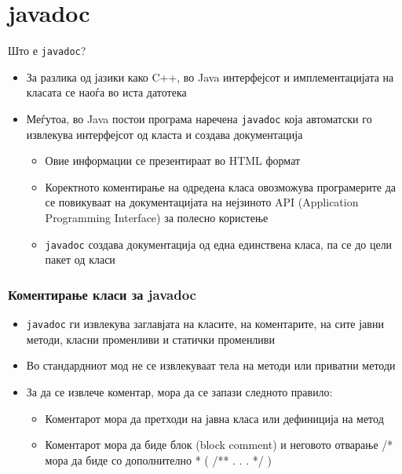 \section{javadoc}

\begin{frame}{Што е \texttt{javadoc}?}

\begin{itemize}
\item
  За разлика од јазики како C++, во Java интерфејсот и имплементацијата на
  класата се наоѓа во иста датотека
\item
  Меѓутоа, во Java постои програма наречена \texttt{javadoc} која автоматски
  го извлекува интерфејсот од класта и создава документација
  \begin{itemize}
  \item
    Овие информации се презентираат во HTML формат
  \item
    Коректното коментирање на одредена класа овозможува програмерите да се
    повикуваат на документацијата на нејзиното API (Application Programming
    Interface) за полесно користење
  \item
    \texttt{javadoc} создава документација од една единствена класа, па се до
    цели пакет од класи
  \end{itemize}
\end{itemize}
\end{frame}

\begin{frame}\frametitle{Коментирање класи за javadoc}

\begin{itemize}
\item
  \texttt{javadoc} ги извлекува заглавјата на класите, на коментарите, на сите
  јавни методи, класни променливи и статички променливи
\item
  Во стандардниот мод не се извлекуваат тела на методи или приватни методи
\item
  За да се извлече коментар, мора да се запази следното правило:
  \begin{itemize}
  \item
    Коментарот мора да претходи на јавна класа или дефиниција на метод
  \item
    Коментарот мора да биде блок (block comment) и неговото отварање /* мора да
    биде со дополнително * ( /** . . . */ )
  \end{itemize}
\end{itemize}
\end{frame}

